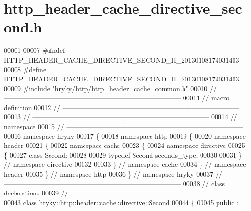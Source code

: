 \hypertarget{http__header__cache__directive__second_8h_source}{\section{http\-\_\-header\-\_\-cache\-\_\-directive\-\_\-second.\-h}
}

\begin{DoxyCode}
00001 
00007 \textcolor{preprocessor}{#ifndef HTTP\_HEADER\_CACHE\_DIRECTIVE\_SECOND\_H\_20130108174031403}
00008 \textcolor{preprocessor}{}\textcolor{preprocessor}{#define HTTP\_HEADER\_CACHE\_DIRECTIVE\_SECOND\_H\_20130108174031403}
00009 \textcolor{preprocessor}{}\textcolor{preprocessor}{#include "\hyperlink{http__header__cache__common_8h}{hryky/http/http_header_cache_common.h}"}
00010 \textcolor{comment}{//
      ------------------------------------------------------------------------------}
00011 \textcolor{comment}{// macro definition}
00012 \textcolor{comment}{//
      ------------------------------------------------------------------------------}
00013 \textcolor{comment}{//
      ------------------------------------------------------------------------------}
00014 \textcolor{comment}{// namespace}
00015 \textcolor{comment}{//
      ------------------------------------------------------------------------------}
00016 \textcolor{keyword}{namespace }hryky
00017 \{
00018 \textcolor{keyword}{namespace }http
00019 \{
00020 \textcolor{keyword}{namespace }header
00021 \{
00022 \textcolor{keyword}{namespace }cache
00023 \{
00024 \textcolor{keyword}{namespace }directive
00025 \{
00027     \textcolor{keyword}{class }Second;
00028 
00029     \textcolor{keyword}{typedef} Second seconds\_type;
00030 
00031 \} \textcolor{comment}{// namespace directive}
00032 
00033 \} \textcolor{comment}{// namespace cache}
00034 \} \textcolor{comment}{// namespace header}
00035 \} \textcolor{comment}{// namespace http}
00036 \} \textcolor{comment}{// namespace hryky}
00037 \textcolor{comment}{//
      ------------------------------------------------------------------------------}
00038 \textcolor{comment}{// class declarations}
00039 \textcolor{comment}{//
      ------------------------------------------------------------------------------}
\hypertarget{http__header__cache__directive__second_8h_source_l00043}{}\hyperlink{classhryky_1_1http_1_1header_1_1cache_1_1directive_1_1_second}{00043} \textcolor{comment}{}\textcolor{keyword}{class }\hyperlink{classhryky_1_1http_1_1header_1_1cache_1_1directive_1_1_second}{hryky::http::header::cache::directive::Second}
00044 \{
00045 \textcolor{keyword}{public} :

\end{DoxyCode}
